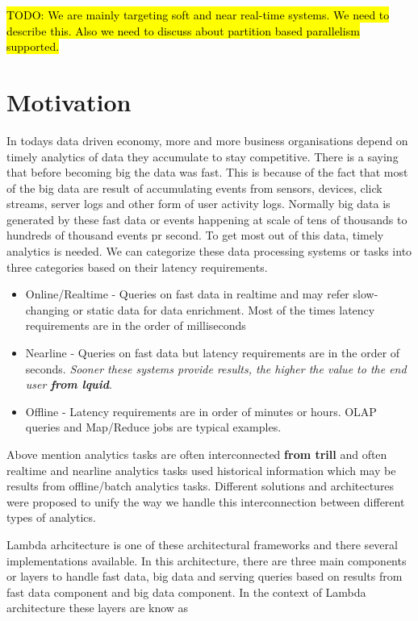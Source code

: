 \documentclass[10pt, conference, compsocconf]{IEEEtran}
\begin{document}
\hl{TODO: We are mainly targeting soft and near real-time systems. We need to describe this. Also we need to discuss about partition based parallelism supported.}

\section{Motivation}
In todays data driven economy, more and more business organisations depend on timely analytics of data they accumulate to stay competitive. There is a saying that before becoming big the data was fast. This is because of the fact that most of the big data are result of accumulating events from sensors, devices, click streams, server logs and other form of user activity logs. Normally big data is generated by these fast data or events happening at scale of tens of thousands to hundreds of thousand events pr second. To get most out of this data, timely analytics is needed. We can categorize these data processing systems or tasks into three categories based on their latency requirements.

\begin{itemize}
  \item Online/Realtime - Queries on fast data in realtime and may refer slow-changing or static data for data enrichment. Most of the times latency requirements are in the order of milliseconds
  \item Nearline - Queries on fast data but latency requirements are in the order of seconds. \textit{Sooner these systems provide results, the higher the value to the end user \textbf{from lquid}}.
  \item Offline - Latency requirements are in order of minutes or hours. OLAP queries and Map/Reduce jobs are typical examples.
\end{itemize}

Above mention analytics tasks are often interconnected \textbf{from trill} and often realtime and nearline analytics tasks used historical information which may be results from offline/batch analytics tasks. Different solutions and architectures were proposed to unify the way we handle this interconnection between different types of analytics. 

Lambda arhcitecture is one of these architectural frameworks and there several implementations available. In this architecture, there are three main components or layers to handle fast data, big data and serving queries based on results from fast data component and big data component. In the context of Lambda architecture these layers are know as
\end{document}
